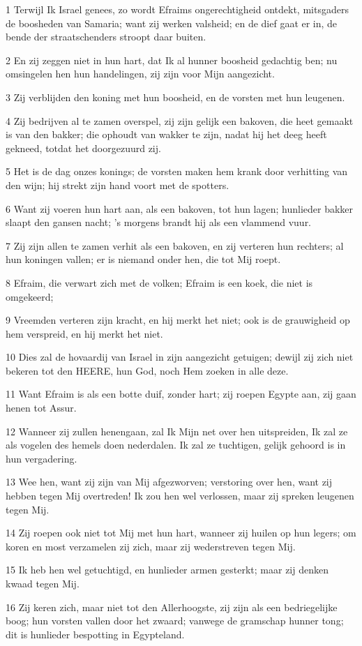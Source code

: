 \par 1 Terwijl Ik Israel genees, zo wordt Efraims ongerechtigheid ontdekt, mitsgaders de boosheden van Samaria; want zij werken valsheid; en de dief gaat er in, de bende der straatschenders stroopt daar buiten.
\par 2 En zij zeggen niet in hun hart, dat Ik al hunner boosheid gedachtig ben; nu omsingelen hen hun handelingen, zij zijn voor Mijn aangezicht.
\par 3 Zij verblijden den koning met hun boosheid, en de vorsten met hun leugenen.
\par 4 Zij bedrijven al te zamen overspel, zij zijn gelijk een bakoven, die heet gemaakt is van den bakker; die ophoudt van wakker te zijn, nadat hij het deeg heeft gekneed, totdat het doorgezuurd zij.
\par 5 Het is de dag onzes konings; de vorsten maken hem krank door verhitting van den wijn; hij strekt zijn hand voort met de spotters.
\par 6 Want zij voeren hun hart aan, als een bakoven, tot hun lagen; hunlieder bakker slaapt den gansen nacht; 's morgens brandt hij als een vlammend vuur.
\par 7 Zij zijn allen te zamen verhit als een bakoven, en zij verteren hun rechters; al hun koningen vallen; er is niemand onder hen, die tot Mij roept.
\par 8 Efraim, die verwart zich met de volken; Efraim is een koek, die niet is omgekeerd;
\par 9 Vreemden verteren zijn kracht, en hij merkt het niet; ook is de grauwigheid op hem verspreid, en hij merkt het niet.
\par 10 Dies zal de hovaardij van Israel in zijn aangezicht getuigen; dewijl zij zich niet bekeren tot den HEERE, hun God, noch Hem zoeken in alle deze.
\par 11 Want Efraim is als een botte duif, zonder hart; zij roepen Egypte aan, zij gaan henen tot Assur.
\par 12 Wanneer zij zullen henengaan, zal Ik Mijn net over hen uitspreiden, Ik zal ze als vogelen des hemels doen nederdalen. Ik zal ze tuchtigen, gelijk gehoord is in hun vergadering.
\par 13 Wee hen, want zij zijn van Mij afgezworven; verstoring over hen, want zij hebben tegen Mij overtreden! Ik zou hen wel verlossen, maar zij spreken leugenen tegen Mij.
\par 14 Zij roepen ook niet tot Mij met hun hart, wanneer zij huilen op hun legers; om koren en most verzamelen zij zich, maar zij wederstreven tegen Mij.
\par 15 Ik heb hen wel getuchtigd, en hunlieder armen gesterkt; maar zij denken kwaad tegen Mij.
\par 16 Zij keren zich, maar niet tot den Allerhoogste, zij zijn als een bedriegelijke boog; hun vorsten vallen door het zwaard; vanwege de gramschap hunner tong; dit is hunlieder bespotting in Egypteland.

